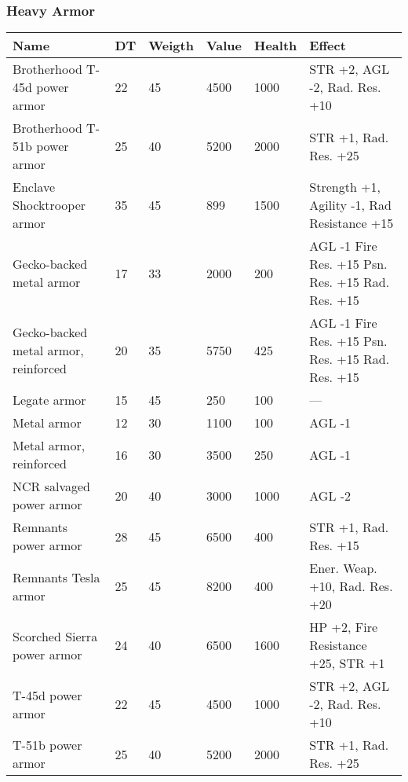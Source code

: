 
\subsubsection{Heavy Armor}
\begin{longtable}{|p{4cm}|p{1.2cm}|p{1.2cm}|p{1.2cm}|p{1.2cm}|p{6cm}|}
\hline
\bfseries Name & \bfseries DT & \bfseries Weigth & \bfseries Value & \bfseries Health & \bfseries Effect \\
\hline
\endhead
Brotherhood T-45d power armor  & 22 & 45 & 4500 & 1000 & STR +2, AGL -2, Rad. Res. +10  \\
Brotherhood T-51b power armor  & 25 & 40 & 5200 & 2000 & STR +1, Rad. Res. +25  \\
Enclave Shocktrooper armor  & 35 & 45 & 899 & 1500 & Strength +1, Agility -1, Rad Resistance +15  \\
Gecko-backed metal armor  & 17 & 33 & 2000 & 200 & AGL -1 Fire Res. +15 Psn. Res. +15 Rad. Res. +15  \\
Gecko-backed metal armor, reinforced  & 20 & 35 & 5750 & 425 & AGL -1 Fire Res. +15 Psn. Res. +15 Rad. Res. +15  \\
Legate armor  & 15 & 45 & 250 & 100 & —  \\
Metal armor  & 12 & 30 & 1100 & 100 & AGL -1  \\
Metal armor, reinforced  & 16 & 30 & 3500 & 250 & AGL -1  \\
NCR salvaged power armor  & 20 & 40 & 3000 & 1000 & AGL -2  \\
Remnants power armor  & 28 & 45 & 6500 & 400 & STR +1, Rad. Res. +15  \\
Remnants Tesla armor  & 25 & 45 & 8200 & 400 & Ener. Weap. +10, Rad. Res. +20  \\
Scorched Sierra power armor  & 24 & 40 & 6500 & 1600 & HP +2, Fire Resistance +25, STR +1  \\
T-45d power armor  & 22 & 45 & 4500 & 1000 & STR +2, AGL -2, Rad. Res. +10  \\
T-51b power armor  & 25 & 40 & 5200 & 2000 & STR +1, Rad. Res. +25  \\
\hline
\end{longtable}
